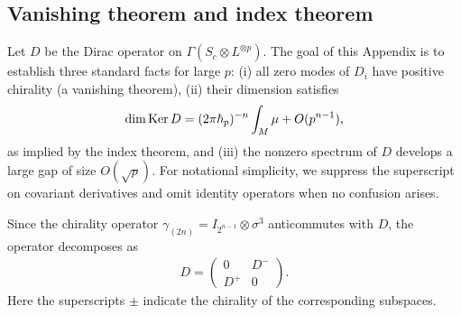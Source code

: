 \documentclass[12pt]{article}
\theoremstyle{definition} %
\theoremstyle{plain} %
\theoremstyle{remark} %
\theoremstyle{underline}
\begin{document}
\subsection{Vanishing theorem and index theorem}
\label{Vanishing}

Let $D$ be the Dirac operator on $\Gamma(S_c \otimes L^{\otimes p})$.
The goal of this Appendix is to establish three standard facts for large $p$:
(i) all zero modes of $D_i$ have positive chirality (a vanishing theorem),
(ii) their dimension satisfies
\begin{align}
    {\rm dim}\, \mathrm{Ker}\, D = (2\pi \hbar_p)^{-n} \int_M \mu + O(p^{n-1}),
\end{align}
as implied by the index theorem, and
(iii) the nonzero spectrum of $D$ develops a large gap of size $O(\sqrt{p})$.
For notational simplicity, we suppress the superscript on covariant derivatives
and omit identity operators when no confusion arises.

Since the chirality operator $\gamma_{(2n)} = I_{2^{n-1}} \otimes \sigma^3$
anticommutes with $D$, the operator decomposes as
\begin{align}
    \label{D_i Weyl}
    D =
    \begin{pmatrix}
       0 & D^{-} \\
       D^{+} & 0
    \end{pmatrix}.
\end{align}
Here the superscripts $\pm$ indicate the chirality of the corresponding
subspaces.
\end{document}
